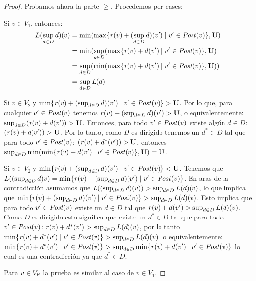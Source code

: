 \begin{proof}
    Probamos ahora la parte $\geq$.   Procedemos por cases:
    
    Si   $v \in V_1$,  entonces:
     \begin{align}
     L (\sup_{d \in D} d)(v) & = \min ( \max \{ \mathit{r}(v) + (\sup_{d \in D} d)(v') \mid v' \in \mathit{Post}(v)\},  \mathbf{U} ) \\                                                                                       
                                                     & =\min(  \sup_{d \in D} ( \max \{\mathit{r}(v) + d(v') \mid v' \in \mathit{Post}(v) \}, \mathbf{U} ) \\
                                                     & = \sup_{d \in D} (\min( \max \{ \mathit{r}(v) + d(v') \mid v' \in \mathit{Post}(v) \}, \mathbf{U})) \\
                                                     & =  \sup_{d \in D} L(d)
    \end{align}
    
    Si $v \in V_2$  y $\min \{ \mathit{r}(v) + (\sup_{d \in D} d)(v') \mid v' \in \mathit{Post}(v)\} > \mathbf{U}$. Por lo que, para
    cualquier $v' \in \mathit{Post}(v)$ tenemos  $\mathit{r}(v) + (\sup_{d \in D} d)(v') > \mathbf{U}$, o equivalentemente: 
    $\sup_{d \in D} (\mathit{r}(v) + d(v')) > \mathbf{U}$. Entonces, para todo $v' \in \mathit{Post}(v)$ existe algún $d \in D$: $(\mathit{r}(v) + d(v')) > \mathbf{U}$.
    Por lo tanto, como $D$ es dirigido tenemos un $d^* \in D$ tal que para todo $v' \in \mathit{Post}(v)$: $(\mathit{r}(v) + d^*(v')) > \mathbf{U}$, entonces 
    $\sup_{d \in D} \min ( \min \{ \mathit{r}(v) + d(v') \mid v' \in \mathit{Post}(v)\}, \mathbf{U}) = \mathbf{U}$.
     
     Si $v \in V_2$  y $\min \{ \mathit{r}(v) + (\sup_{d \in D} d)(v') \mid v' \in \mathit{Post}(v)\} < \mathbf{U}$.  Tenemos que
     $L((\sup_{d \in D} d) v) = \min \{ \mathit{r}(v) + (\sup_{d \in D} d)(v') \mid v' \in \mathit{Post}(v)\}$. En aras de la contradicción asumamos que $L((\sup_{d \in D} d)(v)) > \sup_{d \in D} L(d)(v)$, lo que implica que
    $\min \{ \mathit{r}(v) + (\sup_{d \in D} d)(v') \mid v' \in \mathit{Post}(v)\} > \sup_{d \in D} L(d)(v)$. Esto implica
    que para todo $v' \in \mathit{Post}(v)$ existe un $d \in D$ tal que  $\mathit{r}(v) + d(v')  > \sup_{d \in D} L(d)(v)$.
    Como $D$ es dirigido esto significa que existe un $d^* \in D$ tal que para todo $v' \in \mathit{Post}(v)$: $\mathit{r}(v) + d^*(v')  > \sup_{d \in D} L(d)(v)$,
    por lo tanto $\min \{ \mathit{r}(v) + d^*(v') \mid v' \in \mathit{Post}(v)  \} > \sup_{d \in D} L(d)(v)$, o equivalentemente:
    $\min \{ \mathit{r}(v) + d^*(v') \mid v' \in \mathit{Post}(v)  \} > \sup_{d \in D} \min \{ \mathit{r}(v) + d(v') \mid v' \in \mathit{Post}(v)\}$ lo cual es una contradicción ya que $d^* \in D$.
     
    Para $v \in V_{\mathsf{P}}$ la prueba es similar al caso de $v \in V_1$.\qedhere
\end{proof}


